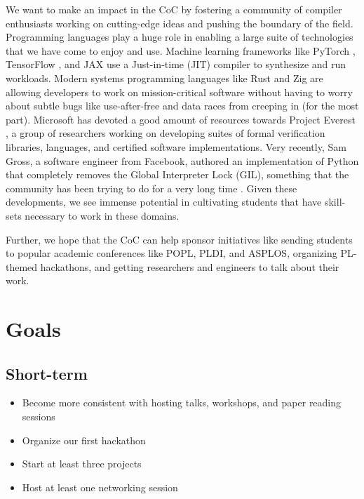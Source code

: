 \documentclass[12pt]{article}
\begin{document}
We want to make an impact in the CoC by fostering a community of compiler enthusiasts working on cutting-edge ideas and pushing the boundary of the field. Programming languages play a huge role in enabling a large suite of technologies that we have come to enjoy and use. Machine learning frameworks like PyTorch \cite{paszke2019pytorch}, TensorFlow \cite{abadi2016tensorflow}, and JAX \cite{jax2018github} use a Just-in-time (JIT) compiler to synthesize and run workloads. Modern systems programming languages like Rust \cite{rustgithub} and Zig \cite{ziggithub} are allowing developers to work on mission-critical software without having to worry about subtle bugs like use-after-free and data races from creeping in (for the most part). Microsoft has devoted a good amount of resources towards Project Everest \cite{projecteverest}, a group of researchers working on developing suites of formal verification libraries, languages, and certified software implementations. Very recently, Sam Gross, a software engineer from Facebook, authored an implementation of Python that completely removes the Global Interpreter Lock (GIL), something that the community has been trying to do for a very long time \cite{gross2021nogil}. Given these developments, we see immense potential in cultivating students that have skill-sets necessary to work in these domains.

Further, we hope that the CoC can help sponsor initiatives like sending students to popular academic conferences like POPL, PLDI, and ASPLOS, organizing PL-themed hackathons, and getting researchers and engineers to talk about their work.


\section{Goals} \label{sec:goals}

\subsection{Short-term}

\begin{itemize}
\item Become more consistent with hosting talks, workshops, and paper reading sessions
\item Organize our first hackathon
\item Start at least three projects
\item Host at least one networking session
\end{itemize}
\end{document}
